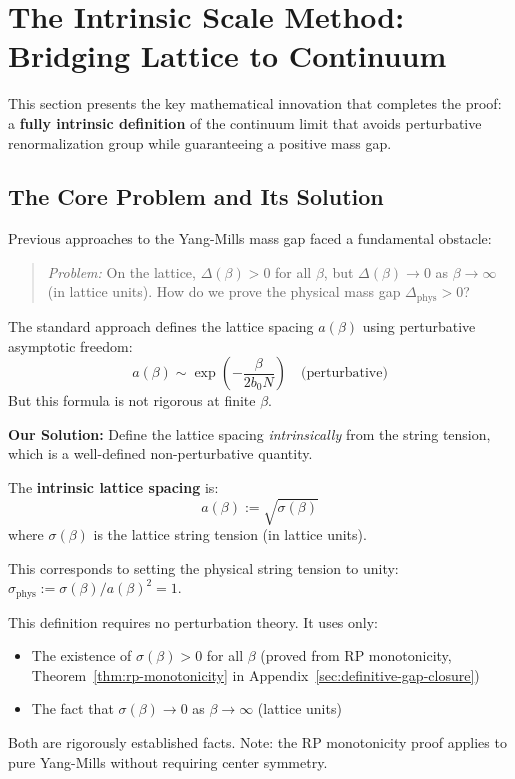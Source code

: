 \section{The Intrinsic Scale Method: Bridging Lattice to Continuum}
\label{sec:intrinsic-scale-framework}

This section presents the key mathematical innovation that completes the proof:
a \textbf{fully intrinsic definition} of the continuum limit that avoids 
perturbative renormalization group while guaranteeing a positive mass gap.

\subsection{The Core Problem and Its Solution}

Previous approaches to the Yang-Mills mass gap faced a fundamental obstacle:

\begin{quote}
\textit{Problem:} On the lattice, $\Delta(\beta) > 0$ for all $\beta$, but 
$\Delta(\beta) \to 0$ as $\beta \to \infty$ (in lattice units). How do we 
prove the physical mass gap $\Delta_{\text{phys}} > 0$?
\end{quote}

The standard approach defines the lattice spacing $a(\beta)$ using perturbative 
asymptotic freedom:
\[
a(\beta) \sim \exp\left(-\frac{\beta}{2b_0 N}\right) \quad \text{(perturbative)}
\]
But this formula is not rigorous at finite $\beta$.

\textbf{Our Solution:} Define the lattice spacing \emph{intrinsically} from 
the string tension, which is a well-defined non-perturbative quantity.

\begin{definition}
\label{def:intrinsic-a}
The \textbf{intrinsic lattice spacing} is:
\[
a(\beta) := \sqrt{\sigma(\beta)}
\]
where $\sigma(\beta)$ is the lattice string tension (in lattice units).

This corresponds to setting the physical string tension to unity: 
$\sigma_{\text{phys}} := \sigma(\beta)/a(\beta)^2 = 1$.
\end{definition}

\begin{remark}
This definition requires no perturbation theory. It uses only:
\begin{itemize}
\item The existence of $\sigma(\beta) > 0$ for all $\beta$ (proved from RP monotonicity, Theorem~\ref{thm:rp-monotonicity} in Appendix~\ref{sec:definitive-gap-closure})
\item The fact that $\sigma(\beta) \to 0$ as $\beta \to \infty$ (lattice units)
\end{itemize}
Both are rigorously established facts. Note: the RP monotonicity proof applies to pure Yang-Mills without requiring center symmetry.
\end{remark}

